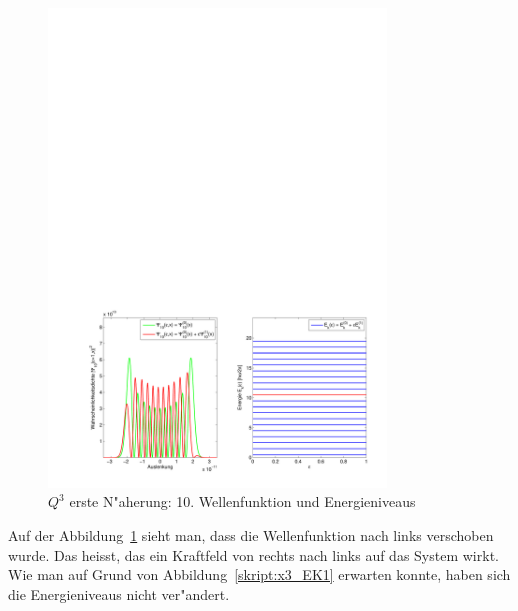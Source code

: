 \begin{refsection}
\begin{figure}	%
\centering
\includegraphics[width=0.8\textwidth]{anharmonisch/images/x3/Stoerung1Wellenfunktion.pdf}
\caption{$Q^3$ erste N"aherung: 10. Wellenfunktion und Energieniveaus 
\label{skript:x3_Stoerung1Wellenfunktion}}
\end{figure}

Auf der Abbildung~\ref{skript:x3_Stoerung1Wellenfunktion} sieht man,
dass die Wellenfunktion nach links verschoben wurde.
Das heisst, das ein Kraftfeld von rechts nach links auf das System wirkt.
Wie man auf Grund von Abbildung~\ref{skript:x3_EK1} erwarten konnte,
haben sich die Energieniveaus nicht ver"andert.


\end{refsection}
